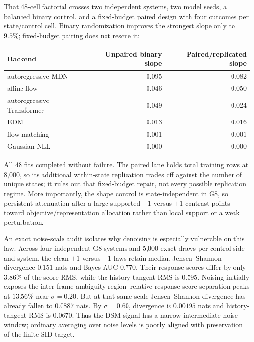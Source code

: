 That 48-cell factorial crosses two independent systems, two model seeds, a
balanced binary control, and a fixed-budget paired design with four outcomes per
state/control cell.  Binary randomization improves the strongest slope only to
$9.5\%$; fixed-budget pairing does not rescue it:

\begin{center}
\begin{tabular}{@{}lrr@{}}
\toprule
Backend & Unpaired binary slope & Paired/replicated slope \\
\midrule
autoregressive MDN & 0.095 & 0.082 \\
affine flow & 0.046 & 0.050 \\
autoregressive Transformer & 0.049 & 0.024 \\
EDM & 0.013 & 0.016 \\
flow matching & 0.001 & $-0.001$ \\
Gaussian NLL & 0.000 & 0.000 \\
\bottomrule
\end{tabular}
\end{center}

All 48 fits completed without failure.  The paired lane holds total training
rows at 8,000, so its additional within-state replication trades off against the
number of unique states; it rules out that fixed-budget repair, not every possible
replication regime.  More importantly, the shape control is state-independent in
G8, so persistent attenuation after a large supported $-1$ versus $+1$ contrast
points toward objective/representation allocation rather than local support or a
weak perturbation.

An exact noise-scale audit isolates why denoising is especially vulnerable on
this law.  Across four independent G8 systems and 5,000 exact draws per control
side and system, the clean $+1$ versus $-1$ laws retain median
Jensen--Shannon divergence $0.151$ nats and Bayes AUC $0.770$.  Their response
scores differ by only $3.86\%$ of the score RMS, while the history-tangent RMS is
$0.595$.  Noising initially exposes the inter-frame ambiguity region: relative
response-score separation peaks at $13.56\%$ near $\sigma=0.20$.  But at that
same scale Jensen--Shannon divergence has already fallen to $0.0887$ nats.  By
$\sigma=0.60$, divergence is $0.00195$ nats and history-tangent RMS is $0.0670$.
Thus the DSM signal has a narrow intermediate-noise window; ordinary averaging
over noise levels is poorly aligned with preservation of the finite SID target.

